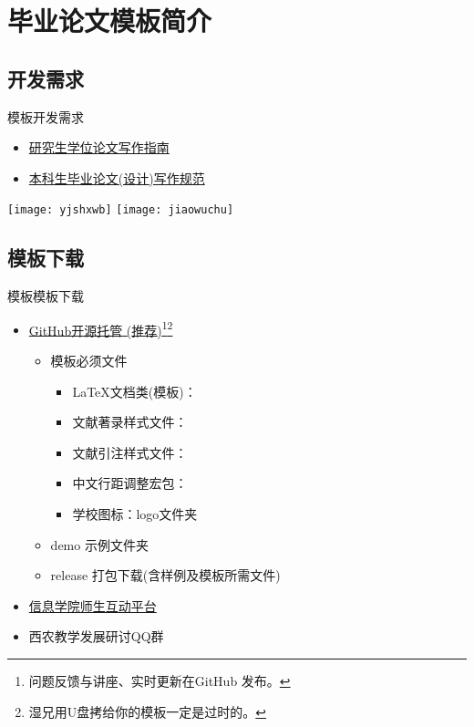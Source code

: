 \documentclass[xcolor=svgnames, t, aspectratio=169]{ctexbeamer}
\begin{document}
\section[\nwafuthesis]{\nwafuthesis 毕业论文模板简介}
\subsection[开发需求]{开发需求}
\begin{frame}[t]{\nwafuthesis 模板}{开发需求}
  \stretchon
  \begin{itemize}
  \item \href{https://yjshy.nwafu.edu.cn/xwgl/xwlwxzgf/index.htm}{研究生学位论文写作指南}
  \item \href{https://jiaowu.nwsuaf.edu.cn/tzgg/34321.htm}{本科生毕业论文(设计)写作规范}
  \end{itemize}
  \centering
  \texttt{[image: yjshxwb]}\quad
  \texttt{[image: jiaowuchu]}
  \stretchoff
\end{frame}

\subsection[模板下载]{模板下载}
\begin{frame}[t]{\nwafuthesis 模板}{模板下载}
  \stretchon
  \begin{itemize}
  \item \href{https://github.com/registor/nwafuthesis}{GitHub开源托管
      (\alert{推荐})}\footnote[frame]{问题反馈与讲座、实时更新在GitHub
      发布。}\footnote[frame]{湿兄用U盘拷给你的模板一定是过时的。}
    \begin{itemize}
    \item 模板必须文件
      \begin{itemize}
      \item \LaTeX 文档类(模板)： 
      \item 文献著录样式文件：
      \item 文献引注样式文件：
      \item 中文行距调整宏包：
      \item 学校图标：logo文件夹
      \end{itemize}
    \item demo 示例文件夹
    \item release 打包下载(含样例及模板所需文件)
    \end{itemize}
  \item \href{http://202.117.179.110/}{信息学院师生互动平台}
  \item 西农教学发展研讨QQ群
  \end{itemize}
  \stretchoff
\end{frame}
\end{document}
